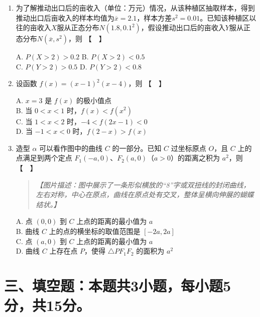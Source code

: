 \documentclass[12pt,a4paper]{article}
\begin{document}
\begin{enumerate}[label=\arabic*.]
\item 为了解推动出口后的亩收入（单位：万元）情况，从该种植区抽取样本，得到推动出口后亩收入的样本均值为$\overline{x}=2.1$，样本方差$s^2=0.01$。已知该种植区以往的亩收入$X$服从正态分布$N(1.8,0.1^2)$，假设推动出口后的亩收入$Y$服从正态分布$N(\overline{x},s^2)$，则 \hfill 【　】

A. $P(X>2)>0.2$ \quad B. $P(X>2)<0.5$ \\
C. $P(Y>2)>0.5$ \quad D. $P(Y>2)<0.8$

\vspace{0.3cm}

\item 设函数 $f(x)=(x-1)^2(x-4)$，则 \hfill 【　】

A. $x=3$ 是 $f(x)$ 的极小值点 \\
B. 当 $0<x<1$ 时，$f(x)<f(x^2)$ \\
C. 当 $1<x<2$ 时，$-4<f(2x-1)<0$ \\
D. 当 $-1<x<0$ 时，$f(2-x)>f(x)$

\vspace{0.3cm}

\item 造型 $\alpha$ 可以看作图中的曲线 $C$ 的一部分。已知 $C$ 过坐标原点 $O$，且 $C$ 上的点满足到两个定点 $F_1(-a,0)$、$F_2(a,0)$（$a>0$）的距离之积为 $a^2$，则 \hfill 【　】

\begin{quote}
\emph{【图片描述：图中展示了一条形似横放的“8”字或双扭线的封闭曲线，左右对称，中心在原点，曲线在原点处有交叉，整体呈横向伸展的蝴蝶结状。】}
\end{quote}

A. 点 $(0,0)$ 到 $C$ 上点的距离的最小值为 $a$ \\
B. 曲线 $C$ 上的点的横坐标的取值范围是 $[-2a,2a]$ \\
C. 点 $(a,0)$ 到 $C$ 上点的距离的最小值为 $a$ \\
D. 曲线 $C$ 上存在点 $P$，使得 $\triangle PF_1F_2$ 的面积为 $a^2$

\end{enumerate}

\section*{三、填空题：本题共3小题，每小题5分，共15分。}
\end{document}
